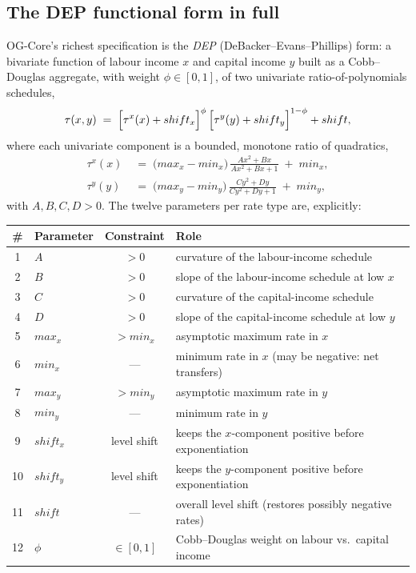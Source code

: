 \subsection{The DEP functional form in full}
\label{subsec:txforms}

OG-Core's richest specification is the \emph{DEP} (DeBacker--Evans--Phillips) form: a bivariate function of labour income $x$ and capital income $y$ built as a Cobb--Douglas aggregate, with weight $\phi\in[0,1]$, of two univariate ratio-of-polynomials schedules,
\begin{equation}
\label{eq:dep}
\tau(x,y) \;=\; \Bigl[\tau^{x}(x) + shift_x\Bigr]^{\phi}\,\Bigl[\tau^{y}(y) + shift_y\Bigr]^{1-\phi} + shift,
\end{equation}
where each univariate component is a bounded, monotone ratio of quadratics,
\begin{align}
\label{eq:depuni}
\tau^{x}(x) &\;=\; \bigl(max_x - min_x\bigr)\,\frac{A x^2 + B x}{A x^2 + B x + 1} \;+\; min_x,\\
\tau^{y}(y) &\;=\; \bigl(max_y - min_y\bigr)\,\frac{C y^2 + D y}{C y^2 + D y + 1} \;+\; min_y,\nonumber
\end{align}
with $A,B,C,D>0$. The twelve parameters per rate type are, explicitly:
\begin{center}
\begin{tabular}{clcl}
\toprule
\# & Parameter & Constraint & Role \\
\midrule
1 & $A$ & $>0$ & curvature of the labour-income schedule \\
2 & $B$ & $>0$ & slope of the labour-income schedule at low $x$ \\
3 & $C$ & $>0$ & curvature of the capital-income schedule \\
4 & $D$ & $>0$ & slope of the capital-income schedule at low $y$ \\
5 & $max_x$ & $> min_x$ & asymptotic maximum rate in $x$ \\
6 & $min_x$ & --- & minimum rate in $x$ (may be negative: net transfers) \\
7 & $max_y$ & $> min_y$ & asymptotic maximum rate in $y$ \\
8 & $min_y$ & --- & minimum rate in $y$ \\
9 & $shift_x$ & level shift & keeps the $x$-component positive before exponentiation \\
10 & $shift_y$ & level shift & keeps the $y$-component positive before exponentiation \\
11 & $shift$ & --- & overall level shift (restores possibly negative rates) \\
12 & $\phi$ & $\in[0,1]$ & Cobb--Douglas weight on labour vs.\ capital income \\
\bottomrule
\end{tabular}
\end{center}
